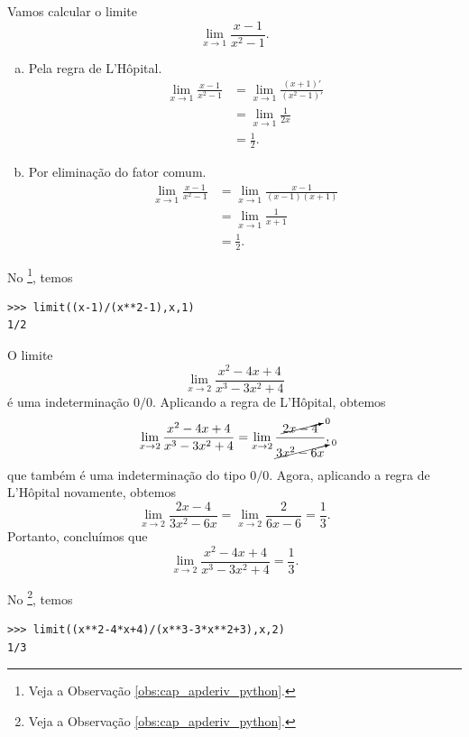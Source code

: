 \begin{ex}
  Vamos calcular o limite
  \begin{equation}
    \lim_{x\to 1} \frac{x-1}{x^2-1}.
  \end{equation}
  \begin{enumerate}[a)]
  \item Pela regra de L'Hôpital.
    \begin{align}
      \lim_{x\to 1} \frac{x-1}{x^2-1} &= \lim_{x\to 1} \frac{(x+1)'}{(x^2-1)'} \\
                                      &= \lim_{x\to 1} \frac{1}{2x} \\
                                      &= \frac{1}{2}.
    \end{align}
  \item Por eliminação do fator comum.
    \begin{align}
      \lim_{x\to 1} \frac{x-1}{x^2-1} &= \lim_{x\to 1} \frac{x-1}{(x-1)(x+1)} \\
                                      &= \lim_{x\to 1} \frac{1}{x+1} \\
                                      &= \frac{1}{2}.
    \end{align}
  \end{enumerate}

  \ifispython
  No \sympy\footnote{Veja a Observação \ref{obs:cap_apderiv_python}.}, temos
\begin{verbatim}
>>> limit((x-1)/(x**2-1),x,1)
1/2
\end{verbatim}
  \fi
\end{ex}

\begin{ex}
  O limite
  \begin{equation}
    \lim_{x\to 2} \frac{x^2-4x+4}{x^3-3x^2+4}
  \end{equation}
  é uma indeterminação $0/0$. Aplicando a regra de L'Hôpital, obtemos
  \begin{equation}
    \lim_{x\to 2} \frac{x^2-4x+4}{x^3-3x^2+4} = \lim_{x\to 2} \frac{\cancelto{0}{2x-4}}{\cancelto{0}{3x^2-6x}},
  \end{equation}
  que também é uma indeterminação do tipo $0/0$. Agora, aplicando a regra de L'Hôpital novamente, obtemos
  \begin{equation}
    \lim_{x\to 2} \frac{2x-4}{3x^2-6x} = \lim_{x\to 2} \frac{2}{6x-6} = \frac{1}{3}.
  \end{equation}
  Portanto, concluímos que
  \begin{equation}
    \lim_{x\to 2} \frac{x^2-4x+4}{x^3-3x^2+4} = \frac{1}{3}.
  \end{equation}  

  \ifispython
  No \sympy\footnote{Veja a Observação \ref{obs:cap_apderiv_python}.}, temos
\begin{verbatim}
>>> limit((x**2-4*x+4)/(x**3-3*x**2+3),x,2)
1/3
\end{verbatim}
  \fi
\end{ex}

